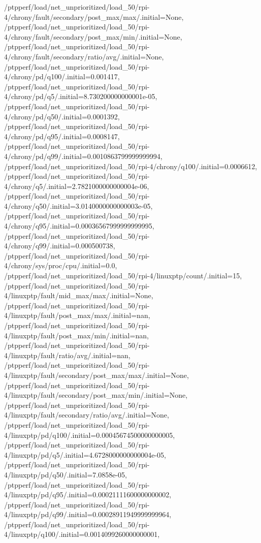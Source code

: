 {    /ptpperf/load/net_unprioritized/load_50/rpi-4/chrony/fault/secondary/post_max/max/.initial=None,
    /ptpperf/load/net_unprioritized/load_50/rpi-4/chrony/fault/secondary/post_max/min/.initial=None,
    /ptpperf/load/net_unprioritized/load_50/rpi-4/chrony/fault/secondary/ratio/avg/.initial=None,
    /ptpperf/load/net_unprioritized/load_50/rpi-4/chrony/pd/q100/.initial=0.001417,
    /ptpperf/load/net_unprioritized/load_50/rpi-4/chrony/pd/q5/.initial=8.730200000000001e-05,
    /ptpperf/load/net_unprioritized/load_50/rpi-4/chrony/pd/q50/.initial=0.0001392,
    /ptpperf/load/net_unprioritized/load_50/rpi-4/chrony/pd/q95/.initial=0.0008147,
    /ptpperf/load/net_unprioritized/load_50/rpi-4/chrony/pd/q99/.initial=0.0010863799999999994,
    /ptpperf/load/net_unprioritized/load_50/rpi-4/chrony/q100/.initial=0.0006612,
    /ptpperf/load/net_unprioritized/load_50/rpi-4/chrony/q5/.initial=2.7821000000000004e-06,
    /ptpperf/load/net_unprioritized/load_50/rpi-4/chrony/q50/.initial=3.0140000000000003e-05,
    /ptpperf/load/net_unprioritized/load_50/rpi-4/chrony/q95/.initial=0.00036567999999999995,
    /ptpperf/load/net_unprioritized/load_50/rpi-4/chrony/q99/.initial=0.000500738,
    /ptpperf/load/net_unprioritized/load_50/rpi-4/chrony/sys/proc/cpu/.initial=0.0,
    /ptpperf/load/net_unprioritized/load_50/rpi-4/linuxptp/count/.initial=15,
    /ptpperf/load/net_unprioritized/load_50/rpi-4/linuxptp/fault/mid_max/max/.initial=None,
    /ptpperf/load/net_unprioritized/load_50/rpi-4/linuxptp/fault/post_max/max/.initial=nan,
    /ptpperf/load/net_unprioritized/load_50/rpi-4/linuxptp/fault/post_max/min/.initial=nan,
    /ptpperf/load/net_unprioritized/load_50/rpi-4/linuxptp/fault/ratio/avg/.initial=nan,
    /ptpperf/load/net_unprioritized/load_50/rpi-4/linuxptp/fault/secondary/post_max/max/.initial=None,
    /ptpperf/load/net_unprioritized/load_50/rpi-4/linuxptp/fault/secondary/post_max/min/.initial=None,
    /ptpperf/load/net_unprioritized/load_50/rpi-4/linuxptp/fault/secondary/ratio/avg/.initial=None,
    /ptpperf/load/net_unprioritized/load_50/rpi-4/linuxptp/pd/q100/.initial=0.00045674500000000005,
    /ptpperf/load/net_unprioritized/load_50/rpi-4/linuxptp/pd/q5/.initial=4.6728000000000004e-05,
    /ptpperf/load/net_unprioritized/load_50/rpi-4/linuxptp/pd/q50/.initial=7.0858e-05,
    /ptpperf/load/net_unprioritized/load_50/rpi-4/linuxptp/pd/q95/.initial=0.00021111600000000002,
    /ptpperf/load/net_unprioritized/load_50/rpi-4/linuxptp/pd/q99/.initial=0.00028911949999999964,
    /ptpperf/load/net_unprioritized/load_50/rpi-4/linuxptp/q100/.initial=0.0014099260000000001,
}
